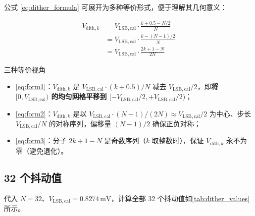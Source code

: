 \documentclass[UTF8,a4paper,11pt]{ctexart}
\newcommand{\Vlsb}{V_{\mathrm{LSB,cal}}}
\begin{document}
公式 \cref{eq:dither_formula} 可展开为多种等价形式，便于理解其几何意义：

\begin{align}
V_{\mathrm{dith},k} &= \Vlsb \cdot \frac{k + 0.5 - N/2}{N} \label{eq:form1} \\
&= \Vlsb \cdot \frac{k - (N-1)/2}{N} \label{eq:form2} \\
&= \Vlsb \cdot \frac{2k + 1 - N}{2N} \label{eq:form3}
\end{align}

\begin{keybox}{三种等价视角}
\begin{itemize}[leftmargin=1.5em]
    \item \cref{eq:form1}：$V_{\mathrm{dith},k}$ 是 $\Vlsb \cdot (k+0.5)/N$ 减去 $\Vlsb/2$，即\textbf{将 $[0, \Vlsb)$ 的均匀网格平移到 $[-\Vlsb/2, +\Vlsb/2)$}；
    \item \cref{eq:form2}：$V_{\mathrm{dith},k}$ 是以 $\Vlsb \cdot (N-1)/(2N) \approx \Vlsb/2$ 为中心、步长 $\Vlsb/N$ 的对称序列，偏移量 $(N-1)/2$ 确保正负对称；
    \item \cref{eq:form3}：分子 $2k+1-N$ 是奇数序列（$k$ 取整数时），保证 $V_{\mathrm{dith},k}$ 永不为零（避免退化）。
\end{itemize}
\end{keybox}

\subsection{32 个抖动值}

代入 $N=32$、$\Vlsb = 0.8274\,\mathrm{mV}$，计算全部 32 个抖动值如\cref{tab:dither_values}所示。
\end{document}
